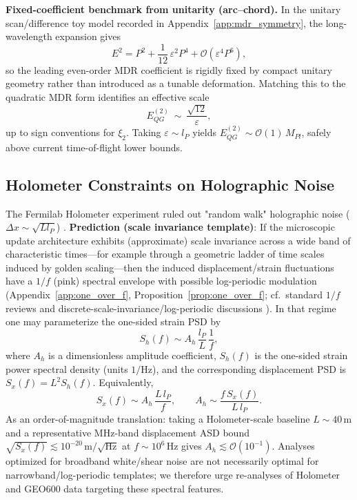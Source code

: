 \noindent
\textbf{Fixed-coefficient benchmark from unitarity (arc--chord).}
In the unitary scan/difference toy model recorded in Appendix~\ref{app:mdr_symmetry}, the long-wavelength expansion gives
\begin{equation}
    E^2 = P^2+\frac{1}{12}\,\varepsilon^2 P^4+\mathcal{O}(\varepsilon^4 P^6),
\end{equation}
so the leading even-order MDR coefficient is rigidly fixed by compact unitary geometry rather than introduced as a tunable deformation. Matching this to the quadratic MDR form identifies an effective scale
\begin{equation}
    E^{(2)}_{QG}\ \sim\ \frac{\sqrt{12}}{\varepsilon},
\end{equation}
up to sign conventions for $\xi_2$. Taking $\varepsilon\sim l_P$ yields $E^{(2)}_{QG}\sim \mathcal{O}(1)\,M_{Pl}$, safely above current time-of-flight lower bounds.

\subsection{Holometer Constraints on Holographic Noise}
The Fermilab Holometer experiment ruled out "random walk" holographic noise ($\Delta x \sim \sqrt{L l_P}$) \cite{Chou2016Holometer}.
\textbf{Prediction (scale invariance template)}: If the microscopic update architecture exhibits (approximate) scale invariance across a wide band of characteristic times---for example through a geometric ladder of time scales induced by golden scaling---then the induced displacement/strain fluctuations have a $1/f$ (pink) spectral envelope with possible log-periodic modulation (Appendix~\ref{app:one_over_f}, Proposition~\ref{prop:one_over_f}; cf.\ standard $1/f$ reviews \cite{DuttaHorn1981,Weissman1988} and discrete-scale-invariance/log-periodic discussions \cite{Sornette1998DSI}). In that regime one may parameterize the one-sided strain PSD by
\begin{equation}
    S_h(f) \sim A_h\,\frac{l_P}{L}\,\frac{1}{f},
\end{equation}
where $A_h$ is a dimensionless amplitude coefficient, $S_h(f)$ is the one-sided strain power spectral density (units $1/\mathrm{Hz}$), and the corresponding displacement PSD is $S_x(f)=L^2 S_h(f)$. Equivalently,
\begin{equation}
    S_x(f)\sim A_h\,\frac{L\,l_P}{f},
    \qquad
    A_h\sim \frac{f\,S_x(f)}{L\,l_P}.
\end{equation}
As an order-of-magnitude translation: taking a Holometer-scale baseline $L\sim 40\,\mathrm{m}$ and a representative MHz-band displacement ASD bound $\sqrt{S_x(f)}\lesssim 10^{-20}\,\mathrm{m}/\sqrt{\mathrm{Hz}}$ \cite{Chou2016Holometer} at $f\sim 10^6\,\mathrm{Hz}$ gives $A_h\lesssim \mathcal{O}(10^{-1})$. Analyses optimized for broadband white/shear noise are not necessarily optimal for narrowband/log-periodic templates; we therefore urge re-analyses of Holometer and GEO600 data targeting these spectral features.

